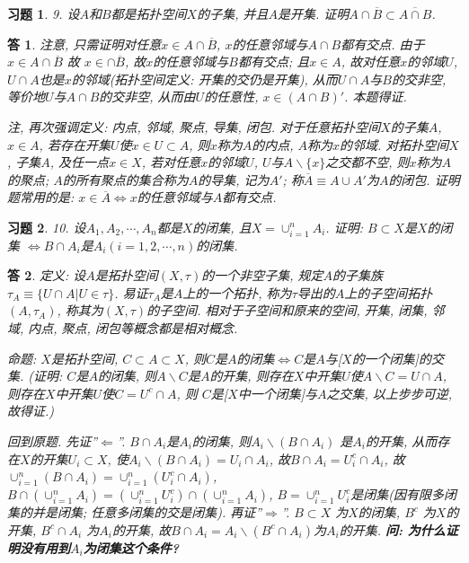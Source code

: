 \documentclass{ctexart}%
\newtheorem*{exercise}{习题}
\newtheorem*{solution}{答}
\theoremstyle{definition}
\theoremstyle{remark}
\begin{document}
\begin{exercise}9. 设$A$和$B$都是拓扑空间$X$的子集, 并且$A$是开集. 证明$A\cap\overline{B}\subset \overline{A\cap B}$.
\end{exercise}
\begin{solution}注意, 只需证明对任意$x\in A\cap\overline{B}$, $x$的任意邻域与$A\cap B$都有交点. 由于$x\in A\cap\overline{B}$ 故 $x\in \cap\overline{B}$, 故$x$的任意邻域与$B$都有交点; 且$x\in A$, 故对任意$x$的邻域$U$, $U\cap A$也是$x$的邻域(拓扑空间定义: 开集的交仍是开集), 从而$U\cap A$与$B$的交非空, 等价地$U$与$A\cap B$的交非空, 从而由$U$的任意性, $x\in (A\cap B)'$. 本题得证.

注, 再次强调定义: 内点, 邻域, 聚点, 导集, 闭包. 对于任意拓扑空间$X$的子集$A$, $x\in A$, 若存在开集$U$使$x \in U\subset A$, 则$x$称为$A$的内点, $A$称为$x$的邻域. 对拓扑空间$X$, 子集$A$, 及任一点$x\in X$, 若对任意$x$的邻域$U$, $U$与$A\backslash \{x\}$之交都不空, 则$x$称为$A$的聚点; $A$的所有聚点的集合称为$A$的导集, 记为$A'$; 称$\overline{A}\equiv A\cup A'$为$A$的闭包. 证明题常用的是: $x\in \overline{A} \Longleftrightarrow x$的任意邻域与$A$都有交点. 
\end{solution}

\begin{exercise}10. 设$A_1,A_2,\cdots, A_n$都是$X$的闭集, 且$X=\cup_{i=1}^nA_i$. 证明: $B\subset X$是$X$的闭集 $\Longleftrightarrow B\cap A_i$是$A_i(i=1,2,\cdots, n)$的闭集.
\end{exercise}
\begin{solution}
定义: 设$A$是拓扑空间$(X,\tau)$的一个非空子集, 规定$A$的子集族$\tau_A\equiv \{U\cap A|U\in\tau\}$. 易证$\tau_A$是$A$上的一个拓扑, 称为$\tau$导出的$A$上的子空间拓扑$(A,\tau_A)$, 称其为$(X,\tau)$的子空间. 相对于子空间和原来的空间, 开集, 闭集, 邻域, 内点, 聚点, 闭包等概念都是相对概念. 

命题: $X$是拓扑空间, $C\subset A\subset X$, 则$C$是$A$的闭集$\Longleftrightarrow C$是$A$与[$X$的一个闭集]的交集. (证明: $C$是$A$的闭集, 则$A\backslash C$是$A$的开集, 则存在$X$中开集$U$使$A\backslash C=U\cap A$, 则存在$X$中开集$U$使$C=U^c \cap A$, 则 $C$是[$X$中一个闭集]与$A$之交集, 以上步步可逆, 故得证.) 

回到原题. 先证''$\Longleftarrow$''. $B\cap A_i $是$A_i$的闭集, 则$A_i\backslash (B\cap A_i)$ 是$A_i$的开集, 从而存在$X$的开集$U_i\subset X$, 使$A_i\backslash (B\cap A_i)=U_i\cap A_i$, 故$B\cap A_i=U_i^c\cap A_i$, 故$\cup_{i=1}^n(B\cap A_i)=\cup_{i=1}^n(U_i^c\cap A_i)$, $B\cap(\cup_{i=1}^nA_i)=(\cup_{i=1}^nU^c_i)\cap(\cup_{i=1}^nA_i)$, $B=\cup_{i=1}^nU^c_i$是闭集(因有限多闭集的并是闭集; 任意多闭集的交是闭集). 再证''$\Longrightarrow$''. $B\subset X$ 为$X$的闭集, $B^c$ 为$X$的开集, $B^c\cap A_i$ 为$A_i$的开集, 故$B\cap A_i=A_i\backslash(B^c\cap A_i)$为$A_i$的开集. 
\textbf{问: 为什么证明没有用到$A_i$为闭集这个条件?}
\end{solution}
\end{document}
